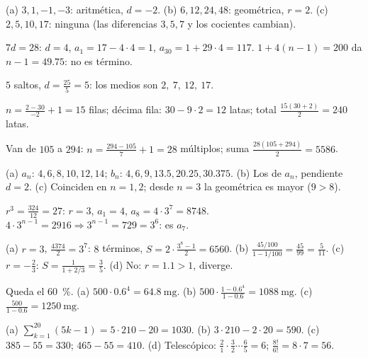 \documentclass[11pt,a4paper]{article}
\begin{document}
\respuestas
\begin{respuestascortas}
\begin{soluciones}
\item (a) $3,1,-1,-3$: aritmética, $d=-2$. (b) $6,12,24,48$: geométrica, $r=2$. (c) $2,5,10,17$: ninguna (las diferencias $3,5,7$ y los cocientes cambian).
\item $7d=28$: $d=4$, $a_1=17-4\cdot4=1$, $a_{30}=1+29\cdot4=117$. $1+4(n-1)=200$ da $n-1=49.75$: no es término.
\item $5$ saltos, $d=\frac{25}{5}=5$: los medios son $2,\ 7,\ 12,\ 17$.
\item $n=\frac{2-30}{-2}+1=15$ filas; décima fila: $30-9\cdot2=12$ latas; total $\frac{15(30+2)}{2}=240$ latas.
\item Van de $105$ a $294$: $n=\frac{294-105}{7}+1=28$ múltiplos; suma $\frac{28(105+294)}{2}=5586$.
\item (a) $a_n$: $4,6,8,10,12,14$; $b_n$: $4,6,9,13.5,20.25,30.375$. (b) Los de $a_n$, pendiente $d=2$. (c) Coinciden en $n=1,2$; desde $n=3$ la geométrica es mayor ($9>8$).
\item $r^{3}=\frac{324}{12}=27$: $r=3$, $a_1=4$, $a_8=4\cdot3^{7}=8748$. $4\cdot3^{n-1}=2916\Rightarrow3^{n-1}=729=3^6$: es $a_7$.
\item (a) $r=3$, $\frac{4374}{2}=3^7$: $8$ términos, $S=2\cdot\frac{3^8-1}{2}=6560$. (b) $\frac{45/100}{1-1/100}=\frac{45}{99}=\frac{5}{11}$. (c) $r=-\frac23$: $S=\frac{1}{1+2/3}=\frac35$. (d) No: $r=1.1>1$, diverge.
\item Queda el \SI{60}{\percent}. (a) $500\cdot0.6^{4}=\SI{64.8}{\milli\gram}$. (b) $500\cdot\frac{1-0.6^4}{1-0.6}=\SI{1088}{\milli\gram}$. (c) $\frac{500}{1-0.6}=\SI{1250}{\milli\gram}$.
\item (a) $\sum_{k=1}^{20}(5k-1)=5\cdot210-20=1030$. (b) $3\cdot210-2\cdot20=590$. (c) $385-55=330$; $465-55=410$. (d) Telescópico: $\frac21\cdot\frac32\cdots\frac65=6$; $\frac{8!}{6!}=8\cdot7=56$.
\end{soluciones}
\end{respuestascortas}
\end{document}
